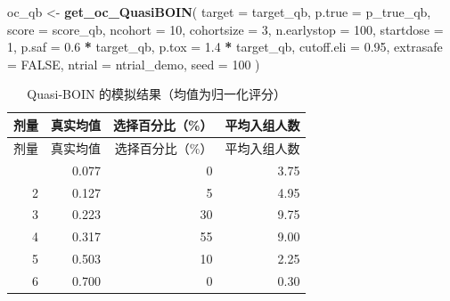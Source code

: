 \documentclass[
  chinese,
]{article}
\newenvironment{Shaded}{\begin{snugshade}}{\end{snugshade}}
\newcommand{\AttributeTok}[1]{\textcolor[rgb]{0.13,0.29,0.53}{#1}}
\newcommand{\ConstantTok}[1]{\textcolor[rgb]{0.56,0.35,0.01}{#1}}
\newcommand{\DecValTok}[1]{\textcolor[rgb]{0.00,0.00,0.81}{#1}}
\newcommand{\FloatTok}[1]{\textcolor[rgb]{0.00,0.00,0.81}{#1}}
\newcommand{\FunctionTok}[1]{\textcolor[rgb]{0.13,0.29,0.53}{\textbf{#1}}}
\newcommand{\NormalTok}[1]{#1}
\newcommand{\OtherTok}[1]{\textcolor[rgb]{0.56,0.35,0.01}{#1}}
\newcommand{\SpecialCharTok}[1]{\textcolor[rgb]{0.81,0.36,0.00}{\textbf{#1}}}
\newcommand{\StringTok}[1]{\textcolor[rgb]{0.31,0.60,0.02}{#1}}
\begin{document}
\begin{Shaded}
\begin{Highlighting}[]
\NormalTok{oc\_qb }\OtherTok{\textless{}{-}} \FunctionTok{get\_oc\_QuasiBOIN}\NormalTok{(}
  \AttributeTok{target =}\NormalTok{ target\_qb, }\AttributeTok{p.true =}\NormalTok{ p\_true\_qb, }\AttributeTok{score =}\NormalTok{ score\_qb,}
  \AttributeTok{ncohort =} \DecValTok{10}\NormalTok{, }\AttributeTok{cohortsize =} \DecValTok{3}\NormalTok{,}
  \AttributeTok{n.earlystop =} \DecValTok{100}\NormalTok{, }\AttributeTok{startdose =} \DecValTok{1}\NormalTok{,}
  \AttributeTok{p.saf =} \FloatTok{0.6} \SpecialCharTok{*}\NormalTok{ target\_qb, }\AttributeTok{p.tox =} \FloatTok{1.4} \SpecialCharTok{*}\NormalTok{ target\_qb,}
  \AttributeTok{cutoff.eli =} \FloatTok{0.95}\NormalTok{, }\AttributeTok{extrasafe =} \ConstantTok{FALSE}\NormalTok{,}
  \AttributeTok{ntrial =}\NormalTok{ ntrial\_demo, }\AttributeTok{seed =} \DecValTok{100}
\NormalTok{)}
\end{Highlighting}
\end{Shaded}

\begin{Shaded}
\end{Shaded}

\begin{longtable}[]{@{}rrrr@{}}
\caption{Quasi-BOIN 的模拟结果（均值为归一化评分）}\tabularnewline
\toprule\noalign{}
剂量 & 真实均值 & 选择百分比（\%） & 平均入组人数 \\
\midrule\noalign{}
\endfirsthead
\toprule\noalign{}
剂量 & 真实均值 & 选择百分比（\%） & 平均入组人数 \\
\midrule\noalign{}
\endhead
\bottomrule\noalign{}
\endlastfoot
1 & 0.077 & 0 & 3.75 \\
2 & 0.127 & 5 & 4.95 \\
3 & 0.223 & 30 & 9.75 \\
4 & 0.317 & 55 & 9.00 \\
5 & 0.503 & 10 & 2.25 \\
6 & 0.700 & 0 & 0.30 \\
\end{longtable}
\end{document}
